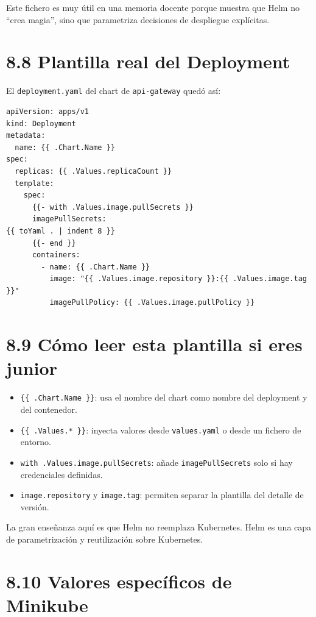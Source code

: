\documentclass[
a4paper,
12pt]{report}
\providecommand{\tightlist}{%
  \setlength{\itemsep}{0pt}\setlength{\parskip}{0pt}}
\begin{document}
Este fichero es muy útil en una memoria docente porque muestra que Helm
no ``crea magia'', sino que parametriza decisiones de despliegue
explícitas.

\section{8.8 Plantilla real del
Deployment}\label{plantilla-real-del-deployment}

El \texttt{deployment.yaml} del chart de \texttt{api-gateway} quedó así:

\begin{verbatim}
apiVersion: apps/v1
kind: Deployment
metadata:
  name: {{ .Chart.Name }}
spec:
  replicas: {{ .Values.replicaCount }}
  template:
    spec:
      {{- with .Values.image.pullSecrets }}
      imagePullSecrets:
{{ toYaml . | indent 8 }}
      {{- end }}
      containers:
        - name: {{ .Chart.Name }}
          image: "{{ .Values.image.repository }}:{{ .Values.image.tag }}"
          imagePullPolicy: {{ .Values.image.pullPolicy }}
\end{verbatim}

\section{8.9 Cómo leer esta plantilla si eres
junior}\label{cuxf3mo-leer-esta-plantilla-si-eres-junior}

\begin{itemize}
\tightlist
\item
  \texttt{\{\{\ .Chart.Name\ \}\}}: usa el nombre del chart como nombre
  del deployment y del contenedor.
\item
  \texttt{\{\{\ .Values.*\ \}\}}: inyecta valores desde
  \texttt{values.yaml} o desde un fichero de entorno.
\item
  \texttt{with\ .Values.image.pullSecrets}: añade
  \texttt{imagePullSecrets} solo si hay credenciales definidas.
\item
  \texttt{image.repository} y \texttt{image.tag}: permiten separar la
  plantilla del detalle de versión.
\end{itemize}

La gran enseñanza aquí es que Helm no reemplaza Kubernetes. Helm es una
capa de parametrización y reutilización sobre Kubernetes.

\section{8.10 Valores específicos de
Minikube}\label{valores-especuxedficos-de-minikube}
\end{document}
